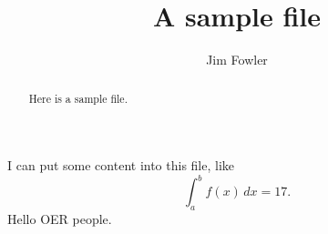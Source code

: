 \documentclass{ximera}
\title{A sample file}
\author{Jim Fowler}
\begin{document}
\begin{abstract}
Here is a sample file.
\end{abstract}

\maketitle

I can put some content into this file, like
\[
  \int_a^b f(x) \, dx = 17.
\]
Hello OER people.
\end{document}
